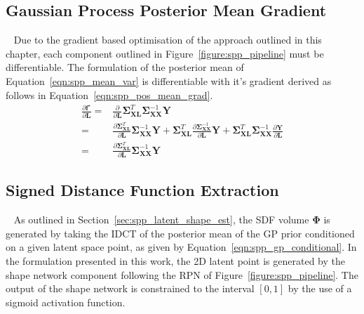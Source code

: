 \subsection{Gaussian Process Posterior Mean Gradient}
~\label{subsec:gp_posterior_mean_grad}
Due to the gradient based optimisation of the approach outlined in this chapter, each 
component outlined in Figure~\ref{figure:spp_pipeline} must be differentiable. The formulation 
of the posterior mean of Equation~\ref{eqn:spp_mean_var} is differentiable with it's gradient 
derived as follows in Equation~\ref{eqn:spp_pos_mean_grad}.
\begin{align}
  \label{eqn:spp_pos_mean_grad}
  \frac{\partial \bm{f}^{\star}}{\partial \bm{L}} ={}&
  \frac{\partial}{\partial \bm{L}}
  \bm{\Sigma}_{\bm{XL}}^{T} \bm{\Sigma}_{\bm{XX}}^{-1} \bm{Y}\\
  ={}& \frac{\partial \bm{\Sigma}_{\bm{XL}}^{T}}{\partial \bm{L}}
  \bm{\Sigma}_{\bm{XX}}^{-1} \bm{Y}
  + \bm{\Sigma}_{\bm{XL}}^{T} 
  \frac{\partial\bm{\Sigma}_{\bm{XX}}^{-1}}{\partial \bm{L}} \bm{Y}
  + \bm{\Sigma}_{\bm{XL}}^{T} \bm{\Sigma}_{\bm{XX}}^{-1} 
  \frac{\partial \bm{Y}}{\partial \bm{L}}\\
  ={}& \frac{\partial \bm{\Sigma}_{\bm{XL}}^{T}}{\partial \bm{L}}
  \bm{\Sigma}_{\bm{XX}}^{-1} \bm{Y}
\end{align}

\subsection{Signed Distance Function Extraction}
~\label{subsec:sdf_extraction}
As outlined in Section~\ref{sec:spp_latent_shape_est}, the SDF volume \( \bm{\Phi} \) 
is generated by taking the IDCT of the posterior mean of the GP prior conditioned on 
a given latent space point, as given by Equation~\ref{eqn:spp_gp_conditional}. In the 
formulation presented in this work, the 2D latent point is generated by the shape 
network component following the RPN of Figure~\ref{figure:spp_pipeline}. 
The output of the shape network is constrained to the interval \( [0, 1] \) by the use 
of a sigmoid activation function.%

